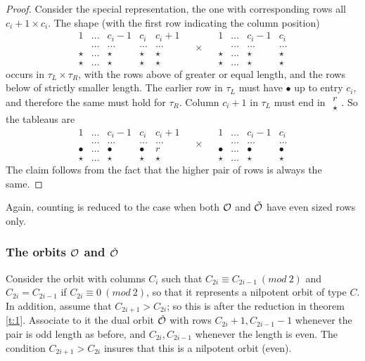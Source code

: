 \documentclass[11pt ,reqno]{amsart}
\begin{document}
\begin{proof}
Consider the special representation, \ie the one with corresponding
rows all $c_i+1\times c_i$. The shape (with the first row indicating
the column position) 
$$
\begin{matrix}
  1&\dots &c_i-1&c_i&c_i+1\\
  &\dots &\dots&\dots&\dots\\
  \star&\dots &\star&\star&\star\\
  \star&\dots &\star&\star&\star
\end{matrix}
\quad\times\quad
\begin{matrix}
  1&\dots     &c_i-1&c_i\\
  &\dots &\dots&\dots\\
  \star&\dots &\star&\star\\
  \star&\dots &\star&\star
\end{matrix}
$$
occurs in $\tau_L\times\tau_R$, with the rows above of greater or
equal length, and the rows below of strictly smaller
length. The earlier row in $\tau_L$ must have $\bullet$ up
to entry $c_i,$ and therefore the same must hold for $\tau_R.$ Column $c_i+1$ 
in $\tau_L$ must end in  $
\begin{matrix}
r\\\star  
\end{matrix}
$. So the tableaus are
$$
\begin{matrix}
    1&\dots &c_i-1&c_i&c_i+1\\
  &\dots &\dots&\dots&\dots\\
  \bullet&\dots &\bullet&\bullet&r\\
  \star&\dots &\star&\star&\star
\end{matrix}
\quad\times\quad
\begin{matrix}
  1&\dots &c_i-1&c_i\\
  &\dots &\dots&\dots\\
  \bullet&\dots &\bullet&\bullet\\
  \star&\dots &\star&\star
\end{matrix}
$$
The claim follows from the fact that the higher pair of rows is always the same.
\end{proof}
Again,   counting is reduced to the case when both $\mathcal O$ and ${\check {\mathcal O}}$ have
even sized rows only.

\subsubsection{The orbits ${\mathcal O}$ and  ${\check {\mathcal O}}$}
Consider the orbit with columns
$C_i$ such that $C_{2i}\equiv C_{2i-1}\ (mod\ 2)$ and
$C_{2i}=C_{2i-1}$ if $C_{2i}\equiv 0\ (mod\ 2)$, so that it
represents a nilpotent orbit of type $C$. In addition, assume that
$C_{2i+1}>C_{2i}$; so this is after the reduction in theorem \ref{t:1}. Associate to it the dual orbit ${\check {\mathcal O}}$ with rows
$C_{2i}+1,C_{2i-1}-1$ whenever the pair is odd length as before, and
$C_{2i},C_{2i-1}$ whenever  the length is even. The condition
$C_{2i+1}>C_{2i}$ insures that this is a nilpotent
orbit (even). 
\end{document}
